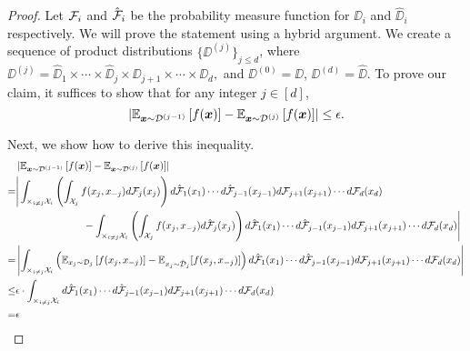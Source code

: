 \begin{proof}
	Let ${\mathcal{F}}_i$ and $\hat{{\mathcal{F}}}_i$ be the probability measure function for $\DD_i$ and $\hat{\DD}_i$ respectively. We will prove the statement using a hybrid argument. We create a sequence of product distributions $\{\DD^{(j)}\}_{j\leq d}$, where $\DD^{(j)}=\hat{\DD}_1\times\cdots\times\hat{\DD}_j\times \DD_{j+1}\times\cdots\times \DD_{d},$ and $\DD^{(0)}=\DD$, $\DD^{(d)}=\hat{\DD}$. To prove our claim, it suffices to show that for any integer $j\in[d]$, $$\left|{\mathbb{E}}_{\boldsymbol{x}\sim {\mathcal{D}}^{(j-1)}}\left[f(\boldsymbol{x})\right]-{\mathbb{E}}_{\boldsymbol{x}\sim {\mathcal{D}}^{(j)}}\left[f(\boldsymbol{x})\right]\right|\leq \epsilon.$$
	
	Next, we show how to derive this inequality.
	\begin{align*}
		&\left|{\mathbb{E}}_{\boldsymbol{x}\sim {\mathcal{D}}^{(j-1)}}\left[f(\boldsymbol{x})\right]-{\mathbb{E}}_{\boldsymbol{x}\sim {\mathcal{D}}^{(j)}}\left[f(\boldsymbol{x})\right]\right|\\
		=&\Bigg{|}\int_{\times_{i\neq j} {\mathcal{X}}_i}\left(\int_{{\mathcal{X}}_j}f(x_{j},x_{-j}) d {\mathcal{F}}_j(x_j)\right) d\hat{{\mathcal{F}}}_1(x_1)\cdots d\hat{{\mathcal{F}}}_{j-1}(x_{j-1}) d{\mathcal{F}}_{j+1}(x_{j+1})\cdots d{\mathcal{F}}_{d}(x_{d})\\
		 & ~~~~~~~~~~~~~~~~~~~~ - \int_{\times_{i\neq j} {\mathcal{X}}_i}\left(\int_{{\mathcal{X}}_j}f(x_{j},x_{-j}) d \hat{{\mathcal{F}}}_j(x_j)\right) d\hat{{\mathcal{F}}}_1(x_1)\cdots d\hat{{\mathcal{F}}}_{j-1}(x_{j-1}) d{\mathcal{F}}_{j+1}(x_{j+1})\cdots d{\mathcal{F}}_{d}(x_{d})\Bigg{|}\\
		 = & \left|\int_{\times_{i\neq j} {\mathcal{X}}_i} \left({\mathbb{E}}_{x_j\sim {\mathcal{D}}_j}\left[f(x_j,x_{-j})\right]-{\mathbb{E}}_{x_j\sim \hat{{\mathcal{D}}}_j}[f(x_j,x_{-j})]\right)
		  d\hat{{\mathcal{F}}}_1(x_1)\cdots d\hat{{\mathcal{F}}}_{j-1}(x_{j-1}) d{\mathcal{F}}_{j+1}(x_{j+1})\cdots d{\mathcal{F}}_{d}(x_{d})\right|\\
		  \leq & \epsilon \cdot\int_{\times_{i\neq j} {\mathcal{X}}_i} d\hat{{\mathcal{F}}}_1(x_1)\cdots d\hat{{\mathcal{F}}}_{j-1}(x_{j-1}) d{\mathcal{F}}_{j+1}(x_{j+1})\cdots d{\mathcal{F}}_{d}(x_{d})\\
		   = & \epsilon
	\end{align*}
\end{proof}



